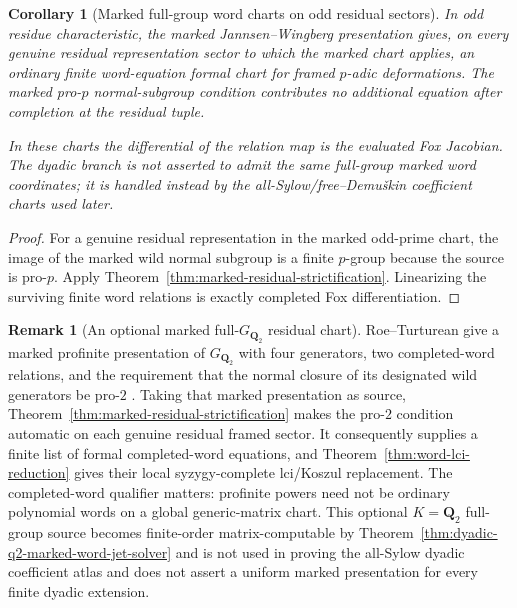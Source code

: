 \documentclass[11pt]{article}
\newtheorem{corollary}[theorem]{Corollary}
\theoremstyle{definition}
\newtheorem{remark}[theorem]{Remark}
\begin{document}
\begin{corollary}[Marked full-group word charts on odd residual sectors]\label{cor:marked-full-group-residual-word-chart}
In odd residue characteristic, the marked Jannsen--Wingberg presentation gives,
on every genuine residual representation sector to which the marked chart
applies, an ordinary finite word-equation formal chart for framed $p$-adic
deformations.  The marked pro-$p$ normal-subgroup condition contributes no
additional equation after completion at the residual tuple.

In these charts the differential of the relation map is the evaluated Fox
Jacobian.  The dyadic branch is not asserted to admit the same full-group marked
word coordinates; it is handled instead by the all-Sylow/free--Demu\v{s}kin
coefficient charts used later.
\end{corollary}

\begin{proof}
For a genuine residual representation in the marked odd-prime chart, the image
of the marked wild normal subgroup is a finite $p$-group because the source is
pro-$p$.  Apply Theorem~\ref{thm:marked-residual-strictification}.  Linearizing
the surviving finite word relations is exactly completed Fox differentiation.
\end{proof}

\begin{remark}[An optional marked full-$G_{\mathbf Q_2}$ residual chart]
\label{rem:q2-marked-full-group-source}
Roe--Turturean give a marked profinite presentation of
$G_{\mathbf Q_2}$ with four generators, two completed-word
relations, and the requirement that the normal closure
of its designated wild generators be pro-$2$
\cite{RoeTurtureanGQ2}.
Taking that marked presentation as source,
Theorem~\ref{thm:marked-residual-strictification} makes
the pro-$2$ condition automatic on each genuine residual
framed sector.  It consequently supplies a finite list
of formal completed-word equations, and
Theorem~\ref{thm:word-lci-reduction} gives their
local syzygy-complete lci/Koszul replacement.
The completed-word qualifier matters: profinite powers
need not be ordinary polynomial words on a global
generic-matrix chart.  This optional $K=\mathbf Q_2$
full-group source becomes finite-order matrix-computable by
Theorem~\ref{thm:dyadic-q2-marked-word-jet-solver} and is not used in proving the
all-Sylow dyadic coefficient atlas and does not
assert a uniform marked presentation for every
finite dyadic extension.
\end{remark}
\end{document}
